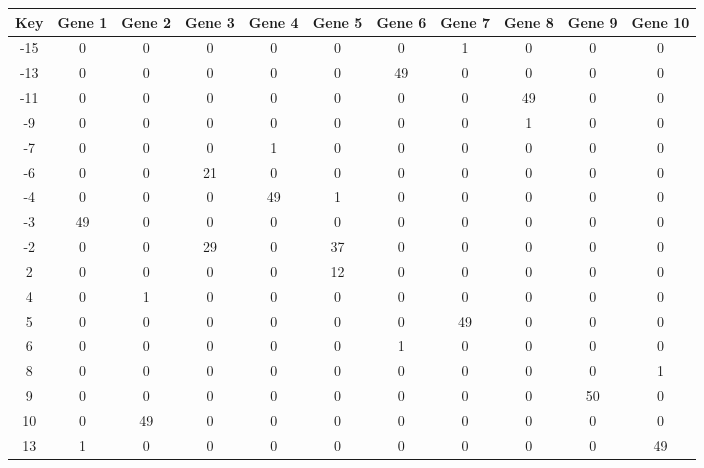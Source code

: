 \begin{tabular}{|c|c|c|c|c|c|c|c|c|c|c|}
\hline
Key & Gene 1 & Gene 2 & Gene 3 & Gene 4 & Gene 5 & Gene 6 & Gene 7 & Gene 8 & Gene 9 & Gene 10 \\
\hline
-15 & 0 & 0 & 0 & 0 & 0 & 0 & 1 & 0 & 0 & 0 \\
-13 & 0 & 0 & 0 & 0 & 0 & 49 & 0 & 0 & 0 & 0 \\
-11 & 0 & 0 & 0 & 0 & 0 & 0 & 0 & 49 & 0 & 0 \\
-9 & 0 & 0 & 0 & 0 & 0 & 0 & 0 & 1 & 0 & 0 \\
-7 & 0 & 0 & 0 & 1 & 0 & 0 & 0 & 0 & 0 & 0 \\
-6 & 0 & 0 & 21 & 0 & 0 & 0 & 0 & 0 & 0 & 0 \\
-4 & 0 & 0 & 0 & 49 & 1 & 0 & 0 & 0 & 0 & 0 \\
-3 & 49 & 0 & 0 & 0 & 0 & 0 & 0 & 0 & 0 & 0 \\
-2 & 0 & 0 & 29 & 0 & 37 & 0 & 0 & 0 & 0 & 0 \\
2 & 0 & 0 & 0 & 0 & 12 & 0 & 0 & 0 & 0 & 0 \\
4 & 0 & 1 & 0 & 0 & 0 & 0 & 0 & 0 & 0 & 0 \\
5 & 0 & 0 & 0 & 0 & 0 & 0 & 49 & 0 & 0 & 0 \\
6 & 0 & 0 & 0 & 0 & 0 & 1 & 0 & 0 & 0 & 0 \\
8 & 0 & 0 & 0 & 0 & 0 & 0 & 0 & 0 & 0 & 1 \\
9 & 0 & 0 & 0 & 0 & 0 & 0 & 0 & 0 & 50 & 0 \\
10 & 0 & 49 & 0 & 0 & 0 & 0 & 0 & 0 & 0 & 0 \\
13 & 1 & 0 & 0 & 0 & 0 & 0 & 0 & 0 & 0 & 49 \\
\hline
\end{tabular}